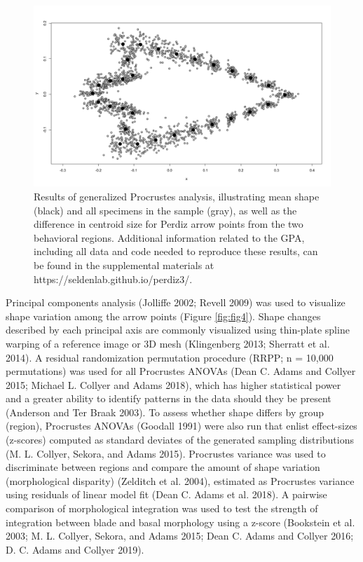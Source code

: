 \documentclass[smallextended]{svjour3}       %
\begin{document}
\begin{figure}
\includegraphics[width=0.95\linewidth]{ms-figs/figure3} \caption{Results of generalized Procrustes analysis, illustrating mean shape (black) and all specimens in the sample (gray), as well as the difference in centroid size for Perdiz arrow points from the two behavioral regions. Additional information related to the GPA, including all data and code needed to reproduce these results, can be found in the supplemental materials at https://seldenlab.github.io/perdiz3/.}\label{fig:fig3}
\end{figure}

Principal components analysis (Jolliffe 2002; Revell 2009) was used to
visualize shape variation among the arrow points (Figure
\ref{fig:fig4}). Shape changes described by each principal axis are
commonly visualized using thin-plate spline warping of a reference image
or 3D mesh (Klingenberg 2013; Sherratt et al. 2014). A residual
randomization permutation procedure (RRPP; n = 10,000 permutations) was
used for all Procrustes ANOVAs (Dean C. Adams and Collyer 2015; Michael
L. Collyer and Adams 2018), which has higher statistical power and a
greater ability to identify patterns in the data should they be present
(Anderson and Ter Braak 2003). To assess whether shape differs by group
(region), Procrustes ANOVAs (Goodall 1991) were also run that enlist
effect-sizes (z-scores) computed as standard deviates of the generated
sampling distributions (M. L. Collyer, Sekora, and Adams 2015).
Procrustes variance was used to discriminate between regions and compare
the amount of shape variation (morphological disparity) (Zelditch et al.
2004), estimated as Procrustes variance using residuals of linear model
fit (Dean C. Adams et al. 2018). A pairwise comparison of morphological
integration was used to test the strength of integration between blade
and basal morphology using a z-score (Bookstein et al. 2003; M. L.
Collyer, Sekora, and Adams 2015; Dean C. Adams and Collyer 2016; D. C.
Adams and Collyer 2019).
\end{document}
